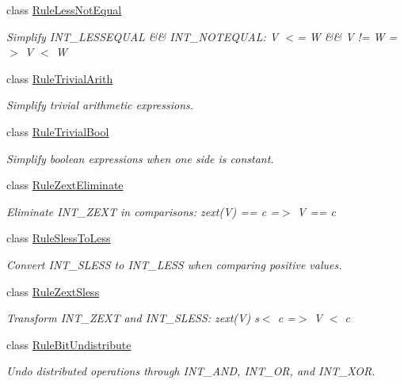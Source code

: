 \begin{DoxyCompactItemize}
class \mbox{\hyperlink{class_rule_less_not_equal}{Rule\+Less\+Not\+Equal}}
\begin{DoxyCompactList}\small\item\em Simplify I\+N\+T\+\_\+\+L\+E\+S\+S\+E\+Q\+U\+AL \&\& I\+N\+T\+\_\+\+N\+O\+T\+E\+Q\+U\+AL\+: {\ttfamily V $<$= W \&\& V != W =$>$ V $<$ W} \end{DoxyCompactList}\item 
class \mbox{\hyperlink{class_rule_trivial_arith}{Rule\+Trivial\+Arith}}
\begin{DoxyCompactList}\small\item\em Simplify trivial arithmetic expressions. \end{DoxyCompactList}\item 
class \mbox{\hyperlink{class_rule_trivial_bool}{Rule\+Trivial\+Bool}}
\begin{DoxyCompactList}\small\item\em Simplify boolean expressions when one side is constant. \end{DoxyCompactList}\item 
class \mbox{\hyperlink{class_rule_zext_eliminate}{Rule\+Zext\+Eliminate}}
\begin{DoxyCompactList}\small\item\em Eliminate I\+N\+T\+\_\+\+Z\+E\+XT in comparisons\+: {\ttfamily zext(\+V) == c =$>$ V == c} \end{DoxyCompactList}\item 
class \mbox{\hyperlink{class_rule_sless_to_less}{Rule\+Sless\+To\+Less}}
\begin{DoxyCompactList}\small\item\em Convert I\+N\+T\+\_\+\+S\+L\+E\+SS to I\+N\+T\+\_\+\+L\+E\+SS when comparing positive values. \end{DoxyCompactList}\item 
class \mbox{\hyperlink{class_rule_zext_sless}{Rule\+Zext\+Sless}}
\begin{DoxyCompactList}\small\item\em Transform I\+N\+T\+\_\+\+Z\+E\+XT and I\+N\+T\+\_\+\+S\+L\+E\+SS\+: {\ttfamily zext(\+V) s$<$ c =$>$ V $<$ c} \end{DoxyCompactList}\item 
class \mbox{\hyperlink{class_rule_bit_undistribute}{Rule\+Bit\+Undistribute}}
\begin{DoxyCompactList}\small\item\em Undo distributed operations through I\+N\+T\+\_\+\+A\+ND, I\+N\+T\+\_\+\+OR, and I\+N\+T\+\_\+\+X\+OR. \end{DoxyCompactList}\item 

\end{DoxyCompactItemize}
